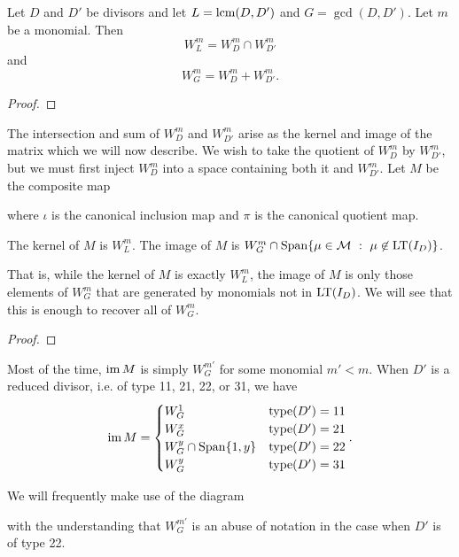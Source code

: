 \begin{proposition}
  Let $D$ and $D'$ be divisors and let $L = \operatorname{lcm}(D, D')$ and $G = \gcd(D, D')$.
  Let $m$ be a monomial. Then
    \[ W_L^m = W_D^m \cap W_{D'}^m \]
  and
    \[ W_G^m = W_D^m + W_{D'}^m. \]
\end{proposition}
\begin{proof}
\end{proof}

The intersection and sum of $W_D^m$ and $W_{D'}^m$ arise as the kernel and image of the matrix which we will now describe.
We wish to take the quotient of $W_D^m$ by $W_{D'}^m$, but we must first inject $W_D^m$ into a space containing both it and $W_{D'}^m$.
Let $M$ be the composite map
\begin{center}
\end{center}
where $\iota$ is the canonical inclusion map and $\pi$ is the canonical quotient map.

\begin{proposition}
  \label{prop_ker_im_M}
  The kernel of $M$ is $W_L^m$.
  The image of $M$ is $W_G^m \cap \operatorname{Span} \{ \mu \in \mathcal{M} ~:~ \mu \not \in \operatorname{LT}(I_D) \}$.
\end{proposition}
That is, while the kernel of $M$ is exactly $W_L^m$,
the image of $M$ is only those elements of $W_G^m$ that are generated by monomials not in $\operatorname{LT}(I_D)$.
We will see that this is enough to recover all of $W_G^m$.
\begin{proof}
\end{proof}

Most of the time, $\operatorname{im} M$ is simply $W_G^{m'}$ for some monomial $m' < m$.
When $D'$ is a reduced divisor, i.e. of type 11, 21, 22, or 31, we have
\[
  \operatorname{im} M = \begin{cases}
    W_G^1 & \operatorname{type}(D') = 11 \\
    W_G^x & \operatorname{type}(D') = 21 \\
    W_G^y \cap \operatorname{Span}\{ 1, y \} & \operatorname{type}(D') = 22 \\
    W_G^y & \operatorname{type}(D') = 31
  \end{cases}.
\]

We will frequently make use of the diagram
\begin{center}
\end{center}
with the understanding that $W_G^{m'}$ is an abuse of notation in the case when $D'$ is of type 22.

